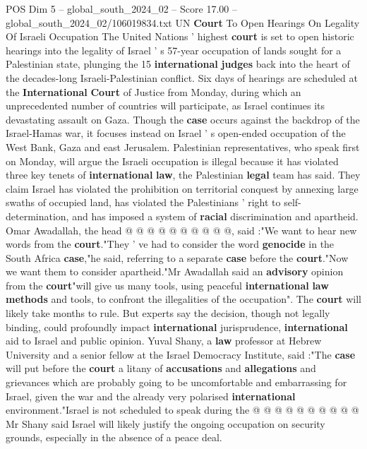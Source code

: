 \begin{textsample}{POS Dim 5 – global\_south\_2024\_02 – Score 17.00 – global\_south\_2024\_02/106019834.txt}  \label{ex:f5_pos_152}
UN \textbf{Court} To Open Hearings On Legality Of Israeli Occupation The United Nations ' highest \textbf{court} is set to open historic hearings into the legality of Israel ' s 57-year occupation of lands sought for a Palestinian state, plunging the 15 \textbf{international} \textbf{judges} back into the heart of the decades-long Israeli-Palestinian conflict.
Six days of hearings are scheduled at the \textbf{International} \textbf{Court} of Justice from Monday, during which an unprecedented number of countries will participate, as Israel continues its devastating assault on Gaza.
Though the \textbf{case} occurs against the backdrop of the Israel-Hamas war, it focuses instead on Israel ' s open-ended occupation of the West Bank, Gaza and east Jerusalem.
Palestinian representatives, who speak first on Monday, will argue the Israeli occupation is illegal because it has violated three key tenets of \textbf{international} \textbf{law}, the Palestinian \textbf{legal} team has said.
They claim Israel has violated the prohibition on territorial conquest by annexing large swaths of occupied land, has violated the Palestinians ' right to self-determination, and has imposed a system of \textbf{racial} discrimination and apartheid.
Omar Awadallah, the head @ @ @ @ @ @ @ @ @ @, said :"We want to hear new words from the \textbf{court}."They ' ve had to consider the word \textbf{genocide} in the South Africa \textbf{case},"he said, referring to a separate \textbf{case} before the \textbf{court}."Now we want them to consider apartheid."Mr Awadallah said an \textbf{advisory} opinion from the \textbf{court}"will give us many tools, using peaceful \textbf{international} \textbf{law} \textbf{methods} and tools, to confront the illegalities of the occupation".
The \textbf{court} will likely take months to rule.
But experts say the decision, though not legally binding, could profoundly impact \textbf{international} jurisprudence, \textbf{international} aid to Israel and public opinion.
Yuval Shany, a \textbf{law} professor at Hebrew University and a senior fellow at the Israel Democracy Institute, said :"The \textbf{case} will put before the \textbf{court} a litany of \textbf{accusations} and \textbf{allegations} and grievances which are probably going to be uncomfortable and embarrassing for Israel, given the war and the already very polarised \textbf{international} environment."Israel is not scheduled to speak during the @ @ @ @ @ @ @ @ @ @ Mr Shany said Israel will likely justify the ongoing occupation on security grounds, especially in the absence of a peace deal.

\end{textsample}
